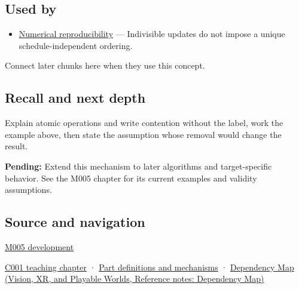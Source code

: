 \subsection{Used by}\label{appendix-e12d1b03fefb-used-by}

\begin{itemize}
\tightlist
\item
  \hyperref[appendix-5f1a2c3f97ff]{Numerical reproducibility} --- Indivisible updates do not impose a unique schedule-independent ordering.
\end{itemize}

Connect later chunks here when they use this concept.

\subsection{Recall and next depth}\label{appendix-e12d1b03fefb-recall-and-next-depth}

Explain atomic operations and write contention without the label, work the example above, then state the assumption whose removal would change the result.

\textbf{Pending:} Extend this mechanism to later algorithms and target-specific behavior. See the M005 chapter for its current examples and validity assumptions.

\subsection{Source and navigation}\label{appendix-e12d1b03fefb-source-and-navigation}

\hyperref[01-foundations-i-ch001-when-arithmetic-meets-uncertainty]{M005 development}

\hyperref[01-foundations-i-ch001-from-a-signal-to-an-interpretation]{C001 teaching chapter} · \hyperref[appendix-fd090d982a15]{Part definitions and mechanisms} · \href{../07-Vision-XR-and-Playable-Worlds/main.pdf\#nameddest=appendix-4ad47bdd269a}{Dependency Map (Vision, XR, and Playable Worlds, Reference notes: Dependency Map)}
